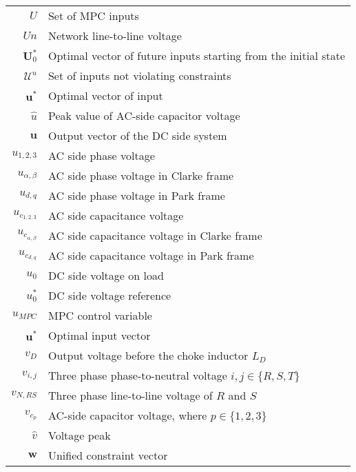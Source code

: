 \begin{scriptsize}
\begin{tabularx}{\textwidth}{r|X}
  $U$                               & Set of MPC inputs\\
  $Un$                              & Network line-to-line voltage\\
  $\textbf{U}^*_0$            & Optimal vector of future inputs starting from the initial state\\
  $\mathcal{U}^u$             & Set of inputs not violating constraints\\
  $\textbf{u}^*$                & Optimal vector of input\\
  $\widehat{u}$				 & Peak value of AC-side capacitor voltage\\
  $\textbf{u}$                  & Output vector of the DC side system\\
  $u_{1,2,3}$                       & AC side phase voltage\\
  $u_{\alpha,\beta}$                & AC side phase voltage in Clarke frame\\
  $u_{d,q}$                         & AC side phase voltage in Park frame\\
  $u_{c_{1,2,3}}$                   & AC side capacitance voltage\\
  $u_{c_{\alpha,\beta}}$            & AC side capacitance voltage in Clarke frame\\
  $u_{c_{d,q}}$                     & AC side capacitance voltage in Park frame\\
  $u_0$                             & DC side voltage on load\\
  $u^*_0$                           & DC side voltage reference\\
  $u_{MPC}$                         & MPC control variable\\
  $\textbf{u}^*$                & Optimal input vector\\
  
  $v_D$								& Output voltage before the choke inductor $L_D$\\
  $v_{i,j}$							& Three phase phase-to-neutral voltage $i,j\in\{R,S,T\}$\\
  $v_{N,RS}$						& Three phase line-to-line voltage of $R$ and $S$\\
  $v_{c_p}$							& AC-side capacitor voltage, where $p\in\{1,2,3\}$\\
  $\hat{v}$							& Voltage peak\\
  
  $\textbf{w}$                & Unified constraint vector \\
  

\end{tabularx}
\end{scriptsize}
